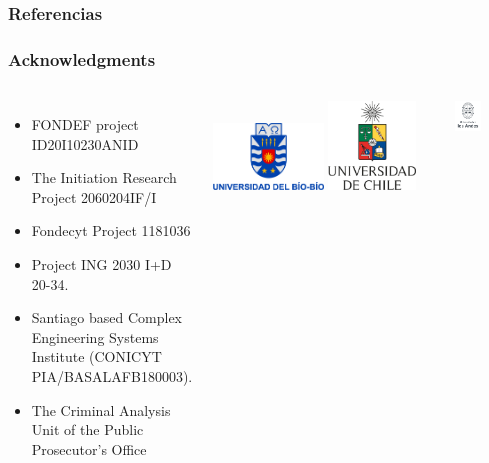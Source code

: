 \documentclass[aspectratio=169]{beamer}
\begin{document}
\begin{frame}[allowframebreaks]
  \frametitle{Referencias}
  \footnotesize
  
\end{frame}

\begin{frame}
\frametitle{Acknowledgments}
\begin{columns}
\begin{itemize}
\item FONDEF project ID20I10230ANID
\item The Initiation Research Project 2060204IF/I
\item Fondecyt Project 1181036
\item Project ING 2030 I+D 20-34.
\item Santiago based Complex Engineering Systems Institute (CONICYT PIA/BASALAFB180003).
\item The Criminal Analysis Unit of the Public Prosecutor's Office
\end{itemize}
\centering
\includegraphics[width=0.5\textwidth]{logos/ubb}
\includegraphics[width=0.4\textwidth]{logos/uchile}
\vspace{0.5\baselineskip}

\includegraphics[width=0.45\textwidth]{logos/uandes}
\end{columns}
\end{frame}

\begin{frame}
\end{frame}
\end{document}
